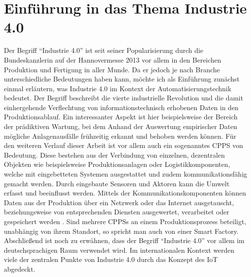 \chapter{Einführung in das Thema Industrie 4.0}

Der Begriff "`Industrie 4.0"' ist seit seiner Popularisierung durch die Bundeskanzlerin auf der Hannovermesse 2013 vor allem in den Bereichen Produktion und Fertigung in aller Munde. Da er jedoch je nach Branche unterschiedliche Bedeutungen haben kann, möchte ich als Einführung zunächst einmal erläutern, was Industrie 4.0 im Kontext der Automatisierungstechnik bedeutet.
Der Begriff beschreibt die vierte industrielle Revolution und die damit einhergehende Verflechtung von informationstechnisch erhobenen Daten in den Produktionsablauf. Ein interessanter Aspekt ist hier beispielsweise der Bereich der prädiktiven Wartung, bei dem Anhand der Auswertung empirischer Daten mögliche Anlagenausfälle frühzeitig erkannt und behoben werden können.
Für den weiteren Verlauf dieser Arbeit ist vor allem auch ein sogenanntes \ac{CPPS} von Bedeutung. Diese bestehen aus der Verbindung von einzelnen, dezentralen Objekten wie beispielsweise Produktionsanlagen oder Logistikkomponenten, welche mit eingebetteten Systemen ausgestattet und zudem kommunikationsfähig gemacht werden. Durch eingebaute Sensoren und Aktoren kann die Umwelt erfasst und beeinflusst werden. Mittels der Kommunikationskomponenten können Daten aus der Produktion über ein Netzwerk oder das Internet ausgetauscht, beziehungsweise von entsprechenden Diensten ausgewertet, verarbeitet oder gespeichert werden
\cite{Bauerhansl2014}.
Sind mehrere \aclp{CPPS} an einem Produktionsprozess beteiligt, unabhängig von ihrem Standort, so spricht man auch von einer Smart Factory.
Abschließend ist noch zu erwähnen, dass der Begriff "`Industrie 4.0"' vor allem im deutschsprachigen Raum verwendet wird. Im internationalen Kontext werden viele der zentralen Punkte von Industrie 4.0 durch das Konzept des \ac{IoT} abgedeckt.
\clearpage




